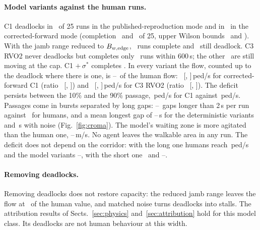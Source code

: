 \paragraph{Model variants against the human runs.}
C1 deadlocks in \EtenCPubDeadlock\ of 25 runs in the published-reproduction mode and in \EtenCOneDeadlock\ in the corrected-forward mode (completion \EtenCPubComplete\ and \EtenCOneComplete\ of 25, upper Wilson bounds \FixAsevenCPubCompleteHi\ and \FixAsevenCOneCompleteHi). With the jamb range reduced to $B_{w,\rm edge}$, \EtenCEdgeComplete\ runs complete and \EtenCEdgeDeadlock\ still deadlock. C3 RVO2 never deadlocks but completes only \EtenCThreeComplete\ runs within 600\,s; the other \EtenCThreeCapped\ are still moving at the cap. C1 $+\,\sigma^\ast$ completes \EtenCSigComplete. In every variant the flow, counted up to the deadlock where there is one, is \FixAsevenCSigFlowRatio--\FixAsevenCThreeFlowRatio\ of the human flow: \EtenCOneFlow\ [\EtenCOneFlowLo, \EtenCOneFlowHi]\,ped/s for corrected-forward C1 (ratio \FixAsevenCOneFlowRatio\ [\FixAsevenCOneFlowRatioLo, \FixAsevenCOneFlowRatioHi]) and \EtenCThreeFlow\ [\EtenCThreeFlowLo, \EtenCThreeFlowHi]\,ped/s for C3 RVO2 (ratio \FixAsevenCThreeFlowRatio\ [\FixAsevenCThreeFlowRatioLo, \FixAsevenCThreeFlowRatioHi]). The deficit persists between the 10\% and the 90\% passage, \FixAsevenCOneWindowFlow\,ped/s for C1 against \FixAsevenHumanWindowFlow\,ped/s. Passages come in bursts separated by long gaps: \EtenCThreeGapsTwo--\EtenCOneGapsTwo\ gaps longer than 2\,s per run against \EtenHumanGapsTwo\ for humans, and a mean longest gap of \EtenCThreeGap--\EtenCPubGap\,s for the deterministic variants and \EtenCSigGap\,s with noise (Fig.~\ref{fig:croma}). The model's waiting zone is more agitated than the human one, \EtenCPubFluct--\EtenCSigFluct\,m/s. No agent leaves the walkable area in any run. The deficit does not depend on the corridor: with the long one humans reach \EtenLongHumanFlow\,ped/s and the model variants \EtenCSigLongFlow--\EtenCThreeLongFlow, with the short one \EtenShortHumanFlow\ and \EtenCSigShortFlow--\EtenCThreeShortFlow.

\paragraph{Removing deadlocks.}
Removing deadlocks does not restore capacity: the reduced jamb range leaves the flow at \FixAsevenCEdgeFlowRatio\ of the human value, and matched noise turns deadlocks into stalls. The attribution results of Sects.~\ref{sec:physics} and~\ref{sec:attribution} hold for this model class. Its deadlocks are not human behaviour at this width.
